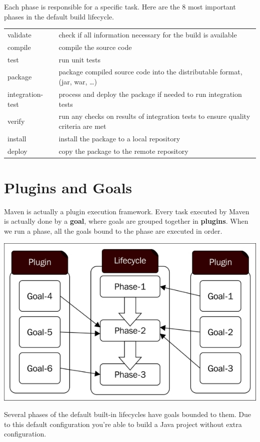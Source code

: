Each phase is responsible for a specific task. Here are the 8 most important phases in the default build lifecycle.

\begin{tabularx}{\textwidth}{ |l|X| } 
 \hline
validate & check if all information necessary for the build is available \\
compile & compile the source code \\
test & run unit tests \\
package & package compiled source code into the distributable format, (jar, war, …)\\
integration-test & process and deploy the package if needed to run integration tests \\
verify & run any checks on results of integration tests to ensure quality criteria are met\\
install & install the package to a local repository\\
deploy & copy the package to the remote repository\\
 \hline
\end{tabularx}

\section{Plugins and Goals}

Maven is actually a plugin execution framework. Every task executed by Maven is actually done by a \textbf{goal}, where goals are grouped together in \textbf{plugins}.  When we run a phase, all the goals bound to the phase are executed in order.

\includegraphics[width=\textwidth]{./images/maven/maven_goals} 

Several phases of the default built-in lifecycles have goals bounded to them.  Due to this default configuration you're able to build a Java project without extra configuration.

